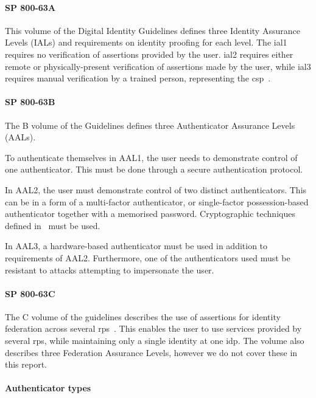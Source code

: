 \paragraph{SP 800-63A}
This volume of the Digital Identity Guidelines defines three Identity Assurance Levels (IALs) and requirements on identity proofing for each level. The \acrshort{ial}1 requires no verification of assertions provided by the user. \acrshort{ial}2 requires either remote or physically-present verification of assertions made by the user, while \acrshort{ial}3 requires manual verification by a trained person, representing the \acrshort{csp}~\cite{Grassi2017DigitalProofing}.

\paragraph{SP 800-63B}
The B volume of the Guidelines defines three Authenticator Assurance Levels (AALs).

To authenticate themselves in AAL1, the user needs to demonstrate control of one authenticator. This must be done through a secure authentication protocol.

In AAL2, the user must demonstrate control of two distinct authenticators. This can be in a form of a multi-factor authenticator, or single-factor possession-based authenticator together with a memorised password. Cryptographic techniques defined in~\cite{Evans2001SECURITYMODULES} must be used.

In AAL3, a hardware-based authenticator must be used in addition to requirements of AAL2. Furthermore, one of the authenticators used must be resistant to attacks attempting to impersonate the user.

\paragraph{SP 800-63C}
The C volume of the guidelines describes the use of assertions for identity federation across several \acrshort{rp}s~\cite{Grassi2017DigitalAssertions}. This enables the user to use services provided by several \acrshort{rp}s, while maintaining only a single identity at one \acrshort{idp}. The volume also describes three Federation Assurance Levels, however we do not cover these in this report.

\paragraph{Authenticator types}

